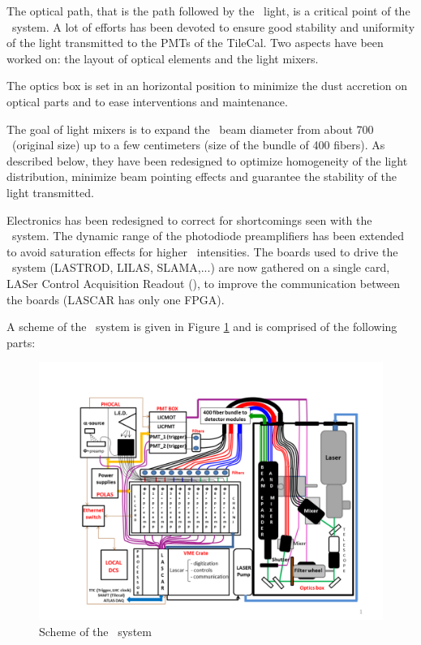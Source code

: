 \par
The optical path, that is the path followed by the \laser~light, is a critical point of the \lasii~system. A lot of efforts has been devoted to ensure good stability and uniformity of the light transmitted to the PMTs of the TileCal. Two aspects have been worked on: the layout of optical elements and the light mixers. \par
The optics box is set in an horizontal position to minimize the dust accretion on optical parts and to ease interventions and maintenance. \par
The goal of light mixers is to expand the \laser~beam diameter from about 700 \mum~(original size) up to a few centimeters (size of the bundle of 400 fibers). As described below, they have been redesigned to optimize homogeneity of the light distribution, minimize beam pointing effects and  guarantee the stability of the light transmitted.
\par
Electronics has been redesigned to correct for shortcomings seen with the \lasi~system. The dynamic range of the photodiode preamplifiers has been extended to avoid saturation effects for higher \laser~intensities. The boards used to drive the \lasi~system (LASTROD, LILAS, SLAMA,...) are now gathered on a single card, LASer Control Acquisition Readout (\lascar), to improve the communication between the boards (LASCAR has only one FPGA).
\par
A scheme of the \lasii~system is given in Figure \ref{fig:laserscheme} and is comprised of the following parts:
\begin{figure}[htbp]
\centering
\includegraphics[width=15cm]{figures/Laser_II_layout.pdf}
\caption{Scheme of the \lasii~system}\label{fig:laserscheme}
\end{figure}
